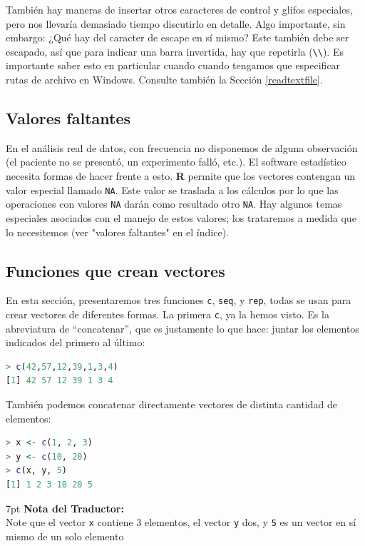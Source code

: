 \documentclass[spanish]{extbook}
\newenvironment{tradnote}{%
  \def\FrameCommand{%
    \hspace{1pt}%
    {\color{darkblue}\vrule width 2pt}%
    {\color{formalshade}\vrule width 4pt}%
    \colorbox{formalshade}%
  }%
  \vspace{12pt}
  \MakeFramed{\advance\hsize-\width\FrameRestore}%
  \noindent\hspace{-4.55pt}%
  \begin{adjustwidth}{}{7pt}%
  \vspace{1pt}%
  \textbf{Nota del Traductor:\\}%
}
{%
  \vspace{6pt}\end{adjustwidth}\endMakeFramed%
}
\numberwithin{equation}{section}
\numberwithin{figure}{section}
\begin{document}
También hay maneras de insertar otros caracteres de control y glifos
especiales, pero nos llevaría demasiado tiempo discutirlo en detalle. Algo
importante, sin embargo: ¿Qué hay del caracter de escape en sí mismo?  Este
también debe ser escapado, así que para indicar una barra invertida, hay que
repetirla (\texttt{\textbackslash{}\textbackslash{}}). Es importante saber esto
en particular cuando cuando tengamos que especificar rutas de archivo en
Windows. Consulte también la Sección \ref{readtextfile}.
\subsection{Valores faltantes}

En el análisis real de datos, con frecuencia no disponemos de alguna
observación (el paciente no se presentó, un experimento falló, etc.). El
software estadístico necesita formas de hacer frente a esto. \textbf{R} permite
que los vectores contengan un valor especial llamado \texttt{NA}. Este valor se
traslada a los cálculos por lo que las operaciones con valores \texttt{NA}
darán como resultado otro \texttt{NA}. Hay algunos temas especiales asociados
con el manejo de estos valores; los trataremos a medida que lo necesitemos (ver
"valores faltantes" en el índice).

\subsection{Funciones que crean vectores}
En esta sección, presentaremos tres funciones \texttt{c}, \texttt{seq}, y
\texttt{rep}, todas se usan para crear vectores de diferentes formas.  La
primera \texttt{c}, ya la hemos visto. Es la abreviatura de ``concatenar'', que
es justamente lo que hace: juntar los elementos indicados del primero al último:

\begin{lstlisting}[language=R]
> c(42,57,12,39,1,3,4)
[1] 42 57 12 39 1 3 4
\end{lstlisting}

También podemos concatenar directamente vectores de distinta cantidad de elementos:

\begin{lstlisting}[language=R]
> x <- c(1, 2, 3)
> y <- c(10, 20)
> c(x, y, 5)
[1] 1 2 3 10 20 5
\end{lstlisting}

\begin{tradnote} Note que el vector \texttt{x} contiene 3 elementos, el vector
\texttt{y} dos, y \texttt{5} es un vector en sí mismo de un solo elemento
\end{tradnote} \newpage
\end{document}
